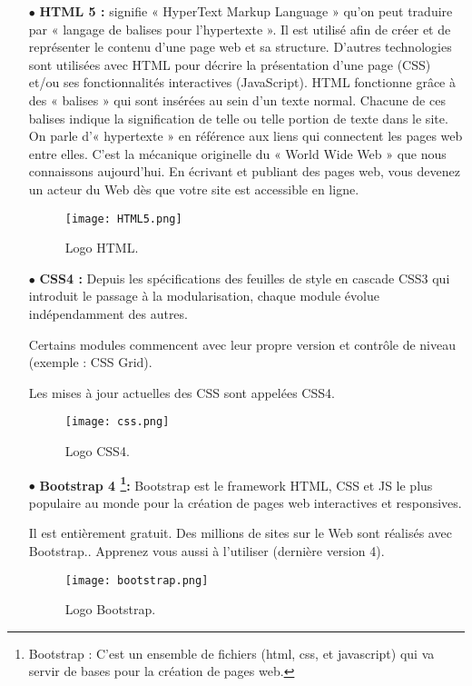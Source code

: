 \begin{itemize}
	\item[$\bullet$] \textbf{HTML 5 :} 	
 signifie « HyperText Markup Language » qu’on peut traduire par « langage de
balises pour l’hypertexte ». Il est utilisé afin de créer et de représenter le contenu d’une
page web et sa structure. D’autres technologies sont utilisées avec HTML pour décrire la
présentation d’une page (CSS) et/ou ses fonctionnalités interactives (JavaScript).
HTML fonctionne grâce à des « balises » qui sont insérées au sein d’un texte normal.
Chacune de ces balises indique la signification de telle ou telle portion de texte dans
le site. On parle d’« hypertexte » en référence aux liens qui connectent les pages web
entre elles. C’est la mécanique originelle du « World Wide Web » que nous connaissons
aujourd’hui. En écrivant et publiant des pages web, vous devenez un acteur du Web dès
que votre site est accessible en ligne.\cite{wiki:Hypertext_Markup_Language}
	\begin{figure}[ht]
		\centering
		\texttt{[image: HTML5.png]}
		\caption{Logo HTML.}
		\label{fig:HTML5 }
	\end{figure}
	\FloatBarrier	
	\medskip
	

		\item[$\bullet$] \textbf{CSS4 :} 
Depuis les spécifications des feuilles de style en cascade CSS3 qui introduit le passage à la modularisation, chaque module évolue indépendamment des autres.

Certains modules commencent avec leur propre version et contrôle de niveau (exemple : CSS Grid).

Les mises à jour actuelles des CSS sont appelées CSS4.\cite{wiki:Feuilles_de_style_en_cascade}
		\begin{figure}[ht]
			\centering
			\texttt{[image: css.png]}
			\caption{Logo CSS4.}
			\label{fig:CSS4 }
		\end{figure}
		\FloatBarrier
		
		\medskip
		
		
	\item[$\bullet$] \textbf{Bootstrap 4 \footnote{Bootstrap : C’est un ensemble de fichiers (html, css, et javascript) qui va servir de bases pour la création de pages web.}:} 
Bootstrap est le framework HTML, CSS et JS le plus populaire au monde pour la création de pages web interactives et responsives.

Il est entièrement gratuit. Des millions de sites sur le Web sont réalisés avec Bootstrap.. Apprenez vous aussi à l’utiliser (dernière version 4).\cite{wiki:Bootstrap_(front-end_framework)}
\begin{figure}[ht]
	\centering
	\texttt{[image: bootstrap.png]}
	\caption{Logo Bootstrap.}
	\label{fig:Logo bootstrap }
\end{figure}
\FloatBarrier


\end{itemize}
